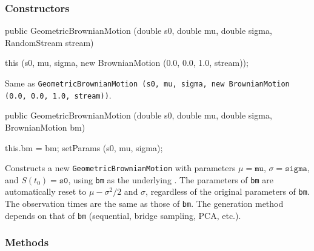 \subsubsection* {Constructors}
\begin{code}

   public GeometricBrownianMotion (double s0, double mu, double sigma,
                                   RandomStream stream) \begin{hide} {
        this (s0, mu, sigma, new BrownianMotion (0.0, 0.0, 1.0, stream));
    }\end{hide}
\end{code}
\begin{tabb}
Same as \texttt{GeometricBrownianMotion (s0, mu, sigma,
new BrownianMotion (0.0, 0.0, 1.0, stream))}.
\end{tabb}
\begin{code}

   public GeometricBrownianMotion (double s0, double mu, double sigma,
                                   BrownianMotion bm) \begin{hide} {
        this.bm = bm;
        setParams (s0, mu, sigma);
    }\end{hide}
\end{code}
\begin{tabb}
Constructs a new \texttt{GeometricBrownianMotion} with parameters
 $\mu = \texttt{mu}$, $\sigma = \texttt{sigma}$, and $S(t_0) = \texttt{s0}$,
using \texttt{bm} as the underlying .
The parameters of \texttt{bm} are automatically reset to
$\mu-\sigma^2/2$ and $\sigma$, regardless of the original parameters
 of \texttt{bm}.
The observation times are the same as those of \texttt{bm}. The generation
method depends on that of \texttt{bm} (sequential, bridge sampling, PCA, etc.).
\end{tabb}

\subsubsection* {Methods}

